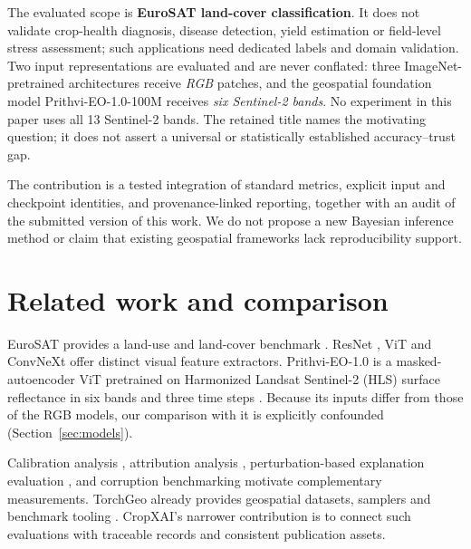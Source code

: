 \documentclass[3p,times,procedia]{elsarticle}
\begin{document}
The evaluated scope is \textbf{EuroSAT land-cover classification}. It does not validate crop-health diagnosis, disease detection, yield estimation or field-level stress assessment; such applications need dedicated labels and domain validation. Two input representations are evaluated and are never conflated: three ImageNet-pretrained architectures receive \emph{RGB} patches, and the geospatial foundation model Prithvi-EO-1.0-100M receives \emph{six Sentinel-2 bands}. No experiment in this paper uses all 13 Sentinel-2 bands. The retained title names the motivating question; it does not assert a universal or statistically established accuracy--trust gap.

The contribution is a tested integration of standard metrics, explicit input and checkpoint identities, and provenance-linked reporting, together with an audit of the submitted version of this work. We do not propose a new Bayesian inference method or claim that existing geospatial frameworks lack reproducibility support.

\section{Related work and comparison}\label{sec:related}
EuroSAT provides a land-use and land-cover benchmark \cite{eurosat}. ResNet \cite{resnet}, ViT \cite{vit} and ConvNeXt \cite{convnext} offer distinct visual feature extractors. Prithvi-EO-1.0 is a masked-autoencoder ViT pretrained on Harmonized Landsat Sentinel-2 (HLS) surface reflectance in six bands and three time steps \cite{prithvi,prithvicard,hls,mae}. Because its inputs differ from those of the RGB models, our comparison with it is explicitly confounded (Section~\ref{sec:models}).

Calibration analysis \cite{calibration}, attribution analysis \cite{attribution,gradcam}, perturbation-based explanation evaluation \cite{rise}, and corruption benchmarking \cite{corruptions} motivate complementary measurements. TorchGeo already provides geospatial datasets, samplers and benchmark tooling \cite{torchgeo}. CropXAI's narrower contribution is to connect such evaluations with traceable records and consistent publication assets.
\end{document}
